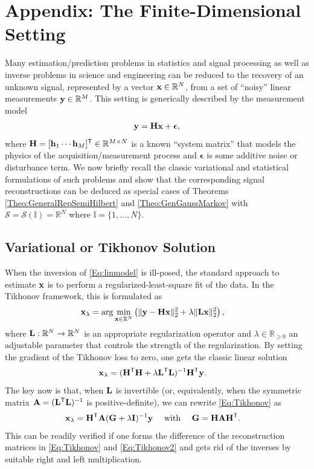 \documentclass[11pt, english,english]{article}
\newcommand{\R}{ \mathbb{R}}
\def\V#1{{\boldsymbol{#1}}}         %
\def\Spc#1{{\mathcal{#1}}}  %
\def\M#1{{\bf{#1}}}  %
\renewcommand{\[}{\begin{equation}}
\renewcommand{\]}[1]{\label{eq:#1}\end{equation}}
\newcommand{\Tr}{\mathsf{T}}
\begin{document}
\section{Appendix: The Finite-Dimensional Setting}
Many estimation/prediction problems in statistics and signal processing as well as inverse problems in science and engineering can be reduced to the recovery of an unknown signal, represented by a vector $\M x \in \R^N$, from a set of ``noisy'' linear measurements $\M y \in \R^M$. This setting is generically described by the measurement model 
\begin{align}
\label{Eq:linmodel}
\M y= \M H \M x + \V \epsilon,
\end{align}
where $\M H=[\M h_1 \cdots \M h_M]^\Tr \in \R^{M \times N}$ is a known ``system matrix'' that models the physics of the acquisition/measurement process and $\V \epsilon$ is some additive noise or disturbance term. We now briefly recall the classic variational and statistical formulations of such problems and show that the corresponding signal reconstructions can be deduced as special cases of Theorems \ref{Theo:GeneralRepSemiHilbert} and \ref{Theo:GenGaussMarkov} with $\Spc S=\Spc S(\mathbb{I})=\R^N$ where $\mathbb{I}=\{1,\dots,N\}$. 

\subsection{Variational or Tikhonov Solution}
When the inversion of \eqref{Eq:linmodel} is ill-posed, the standard approach to estimate $\M x$ is to perform a regularized-least-square fit of the data. %
In the Tikhonov framework, this is formulated as
\begin{align}
\label{Eq:Tikformulation}
\M x_{\lambda}&=\arg \min_{\M x \in \R^N} \left( \|\M y - \M H \M x\|_2^2 + \lambda \|\M L \M x\|_2^2\right),
\end{align}
where $\M L: \R^N \to \R^N$ is an appropriate regularization operator and $\lambda\in \R_{\ge0}$
an adjustable parameter that controls the strength of the regularization. By setting the gradient of the Tikhonov loss to zero, one gets the classic linear solution
\begin{align}
\M x_{\lambda}
&=%
(\M H^\Tr \M H + \lambda \M L^\Tr\M L)^{-1} \M H^\Tr \M y.
\label{Eq:Tikhonov}
\end{align}
The key now is that, when $\M L$ is invertible (or, equivalently, when the symmetric matrix $\M A=(\M L^\Tr \M L)^{-1}$ is positive-definite), we can rewrite \eqref{Eq:Tikhonov} as
\begin{align}
\M x_{\lambda}
&=%
\M H^\Tr\M A ( \M G+ \lambda \M I)^{-1} \M y \quad  \mbox{ with }\quad 
\M G= \M H \M A\M H^\Tr.
\label{Eq:Tikhonov2}
\end{align}
This can be readily verified if one forms the difference of the reconstruction matrices in \eqref{Eq:Tikhonov} and \eqref{Eq:Tikhonov2} and gets rid of the inverses by suitable right and left multiplication. 
\end{document}
